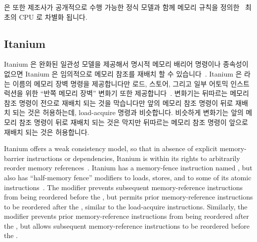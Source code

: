 은 또한 제조사가 공개적으로 수행 가능한 정식 모델과 함께 메모리 규칙을
정의한~\cite{ARMv8A:2017} 최초의 CPU 로 차별화 됩니다.

\subsection{Itanium}
\label{sec:memorder:Itanium}

Itanium 은 완화된 일관성 모델을 제공해서 명시적 메모리 배리어 명령이나 종속성이
없으면 Itanium 은 임의적으로 메모리 참조를 재배치 할 수
있습니다~\cite{IntelItanium02v2}.
Itanium 은  라는 이름의 메모리 장벽 명령을 제공합니다만 로드, 스토어,
그리고 일부 어토믹 인스트럭션을 위한 ``반쪽 메모리 장벽'' 변화기 또한
제공합니다~\cite{IntelItanium02v3}.
 변화기는 뒤따르는 메모리 참조 명령이  전으로 재배치 되는 것을
막습니다만 앞의 메모리 참조 명령이  뒤로 재배치 되는 것은 허용하는데,
 load-acquire 명령과 비슷합니다.
비슷하게  변화기는 앞의 메모리 참조 명령이  뒤로 재배치 되는
것은 막지만 뒤따르는 메모리 참조 명령이  앞으로 재배치 되는 것은
허용합니다.

\iffalse

Itanium offers a weak consistency model, so that in absence of explicit
memory-barrier instructions or dependencies, Itanium is within its rights
to arbitrarily reorder memory references~\cite{IntelItanium02v2}.
Itanium has a memory-fence instruction named , but also has
``half-memory fence'' modifiers to loads, stores, and to some of its atomic
instructions~\cite{IntelItanium02v3}.
The  modifier prevents subsequent memory-reference instructions
from being reordered before the , but permits
prior memory-reference instructions to be reordered after the ,
similar to the  load-acquire instructions.
Similarly, the  modifier prevents prior memory-reference
instructions from being reordered after the , but allows
subsequent memory-reference instructions to be reordered before
the .

